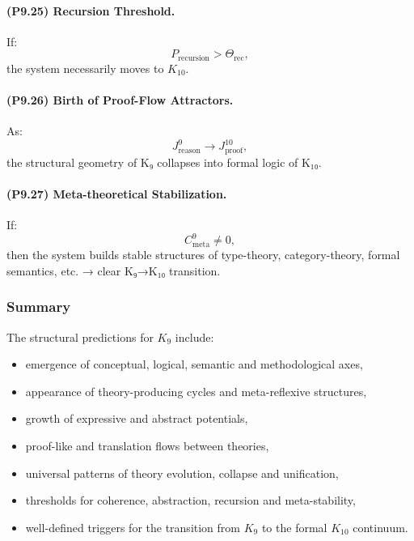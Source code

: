 \paragraph{(P9.25) Recursion Threshold.}
If:
\[
P_{\mathrm{recursion}} > \Theta_{\mathrm{rec}},
\]
the system necessarily moves to $K_{10}$.

\paragraph{(P9.26) Birth of Proof-Flow Attractors.}
As:
\[
J_{\mathrm{reason}}^9 
\to 
J_{\mathrm{proof}}^{10},
\]
the structural geometry of K₉ collapses into formal logic of K₁₀.

\paragraph{(P9.27) Meta-theoretical Stabilization.}
If:
\[
C_{\mathrm{meta}}^9 \neq 0,
\]
then the system builds stable structures of type-theory, category-theory, formal semantics, etc. → clear K₉→K₁₀ transition.

\subsubsection{Summary}

The structural predictions for $K_9$ include:
\begin{itemize}
    \item emergence of conceptual, logical, semantic and methodological axes,
    \item appearance of theory-producing cycles and meta-reflexive structures,
    \item growth of expressive and abstract potentials,
    \item proof-like and translation flows between theories,
    \item universal patterns of theory evolution, collapse and unification,
    \item thresholds for coherence, abstraction, recursion and meta-stability,
    \item well-defined triggers for the transition from $K_9$ to the formal $K_{10}$ continuum.
\end{itemize}
